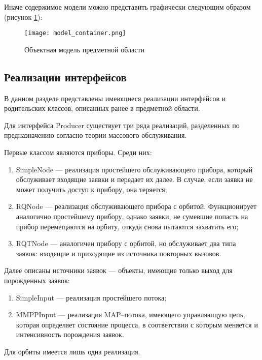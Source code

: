 Иначе содержимое модели можно представить графически следующим образом (рисунок \ref{model_container}):
\begin{figure}[H]
	\centering
	\texttt{[image: model\_container.png]}
	\caption{Объектная модель предметной области}
	\label{model_container}
\end{figure}

\subsection{Реализации интерфейсов}
В данном разделе представлены имеющиеся реализации интерфейсов и родительских классов, описанных ранее в предметной области.

Для интерфейса Producer существует три ряда реализаций, разделенных по предназначению согласно теории массового обслуживания. 

Первые классом являются приборы. Среди них:
\begin{enumerate}
	\item SimpleNode --- реализация простейшего обслуживающего прибора, который обслуживает входящие заявки и передает их далее. В случае, если заявка не может получить доступ к прибору, она теряется;
	\item RQNode --- реализация обслуживающего прибора с орбитой. Функционирует аналогично простейшему прибору, однако заявки, не сумевшие попасть на прибор перемещаются на орбиту, откуда снова пытаются захватить его;
	\item RQTNode --- аналогичен прибору с орбитой, но обслуживает два типа заявок: входящие и приходящие из источника повторных вызовов.
\end{enumerate}


Далее описаны источники заявок --- объекты, имеющие только выход для порожденных заявок:
\begin{enumerate}
	\item SimpleInput --- реализация простейшего потока;
	\item MMPPInput --- реализация MAP--потока, имеющего управляющую цепь, которая определяет состояние процесса, в соответствии с которым меняется и интенсивность порождения заявок.
\end{enumerate}

Для орбиты имеется лишь одна реализация.


